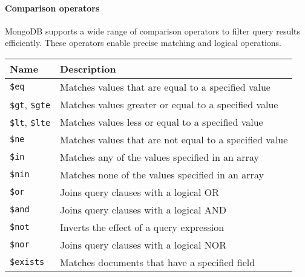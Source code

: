 \paragraph*{Comparison operators}
MongoDB supports a wide range of comparison operators to filter query results efficiently. 
These operators enable precise matching and logical operations. 
\begin{longtable}{|l|p{10cm}|}
    \hline \textbf{Name} & \textbf{Description} \\ \hline
    \texttt{\$eq} & Matches values that are equal to a specified value \\ \hline
    \texttt{\$gt}, \texttt{\$gte} & Matches values greater or equal to a specified value \\ \hline
    \texttt{\$lt}, \texttt{\$lte} & Matches values less or equal to a specified value \\ \hline
    \texttt{\$ne} & Matches values that are not equal to a specified value \\ \hline
    \texttt{\$in} & Matches any of the values specified in an array \\ \hline
    \texttt{\$nin} & Matches none of the values specified in an array \\ \hline
    \texttt{\$or} & Joins query clauses with a logical OR \\ \hline
    \texttt{\$and} & Joins query clauses with a logical AND \\ \hline
    \texttt{\$not} & Inverts the effect of a query expression \\ \hline
    \texttt{\$nor} & Joins query clauses with a logical NOR \\ \hline
    \texttt{\$exists} & Matches documents that have a specified field \\ \hline
\end{longtable}